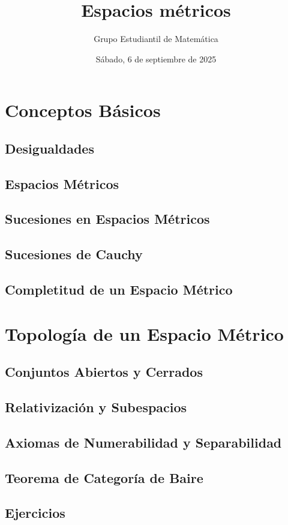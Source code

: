 \documentclass{book}
\title{Espacios métricos}
\author{Grupo Estudiantil de Matemática}
\date{Sábado, 6 de septiembre de 2025}
\begin{document}
\maketitle
\tableofcontents

\chapter{Conceptos Básicos}
\section{Desigualdades}
\section{Espacios Métricos}
\section{Sucesiones en Espacios Métricos}
\section{Sucesiones de Cauchy}
\section{Completitud de un Espacio Métrico}
\chapter{Topología de un Espacio Métrico}
\section{Conjuntos Abiertos y Cerrados}
\section{Relativización y Subespacios}
\section{Axiomas de Numerabilidad y Separabilidad}
\section{Teorema de Categoría de Baire}
\section{Ejercicios}
\end{document}
